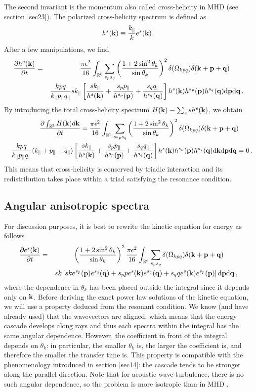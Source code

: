 \documentclass{jpp}
\def\be{\begin{equation}}
\def\ee{\end{equation}}
\def\ba{\begin{eqnarray}}
\def\ea{\end{eqnarray}}
\def\kk{{\bf k}}
\def\pp{{\bf p}}
\def\qq{{\bf q}}
\def\kpa{k_{\parallel}}
\def\ppa{p_{\parallel}}
\def\qpa{q_{\parallel}}
\def\dd{\mathrm{d}}
\def\RR{{\mathbb{R}}}
\begin{document}
The second invariant is the momentum also called cross-helicity in MHD (see section \ref{sec23}). The polarized cross-helicity spectrum is defined as
\be
h^s(\kk) \equiv \frac{\kpa}{k} e^s(\kk) \, .
\ee
After a few manipulations, we find
\ba
\frac{\partial h^s(\kk)}{\partial t} &=& 
\frac{\pi \epsilon^2}{16} \int_{\RR^{6}} \sum_{s_{p} s_{q}}  \left(\frac{1 + 2 \sin^2 \theta_k}{\sin \theta_k}\right)^2
\delta(\Omega_{kpq}) \delta(\kk+\pp+\qq) \quad \quad \label{KE2} \\
&& \frac{kpq}{\kpa\ppa\qpa} s \kpa
\left[ \frac{s\kpa}{h^s(\kk)} + \frac{s_{p} \ppa}{h^{s_{p}}(\pp)} + \frac{s_{q} \qpa}{h^{s_{q}}(\qq)} \right] 
h^{s}(\kk) h^{s_{p}}(\pp) h^{s_{q}}(\qq) \dd \pp \dd \qq \, . \nonumber 
\ea
By introducing the total cross-helicity spectrum $H(\kk) \equiv \sum_s s h^s(\kk)$, we obtain
\ba
&&\frac{\partial \int_{\RR^{3}} H(\kk) d\kk}{\partial t} = 
\frac{\pi \epsilon^{2}}{16} \int_{\RR^{9}} \sum_{s s_{p} s_{q}}  \left(\frac{1 + 2 \sin^2 \theta_k}{\sin \theta_k}\right)^2
\delta(\Omega_{kpq}) \delta(\kk+\pp+\qq) \quad \quad \label{KE2} \\
&& \frac{kpq}{\kpa\ppa\qpa} (\kpa+\ppa+\qpa)
\left[ \frac{s\kpa}{h^s(\kk)} + \frac{s_{p} \ppa}{h^{s_{p}}(\pp)} + \frac{s_{q} \qpa}{h^{s_{q}}(\qq)} \right] 
h^{s}(\kk) h^{s_{p}}(\pp) h^{s_{q}}(\qq) \dd \kk \dd \pp \dd \qq = 0 \, . \nonumber 
\ea
This means that cross-helicity is conserved by triadic interaction and its redistribution takes place within a triad satisfying the resonance condition. 

\subsection{Angular anisotropic spectra}
For discussion purposes, it is best to rewrite the kinetic equation for energy as follows
\ba
\frac{\partial e^s(\kk)}{\partial t} &=& \left(\frac{1 + 2 \sin^2 \theta_k}{\sin \theta_k}\right)^2
\frac{\pi \epsilon^{2}}{16} \int_{\RR^{6}} \sum_{s_{p} s_{q}}  
\delta(\Omega_{kpq}) \delta(\kk+\pp+\qq) \quad \quad \label{Kx1} \\
&& s k 
\left[ sk e^{s_p}(\pp) e^{s_q}(\qq) + s_p p e^s(\kk) e^{s_q}(\qq) + s_q q e^s(\kk) e^{s_p}(\pp) \right] 
 \dd \pp \dd \qq \, , \nonumber 
\ea
where the dependence in $\theta_k$ has been placed outside the integral since it depends only on $\kk$. Before deriving the exact power law solutions of the kinetic equation, we will use a property deduced from the resonant condition. We know (and have already used) that the wavevectors are aligned, which means that the energy cascade develops along rays and thus each spectra within the integral has the same angular dependence. However, the coefficient in front of the integral depends on $\theta_k$: in particular, the smaller $\theta_k$ is, the larger the coefficient is, and therefore the smaller the transfer time is. This property is compatible with the phenomenology introduced in section \ref{sec14}: the cascade tends to be stronger along the parallel direction. 
Note that for acoustic wave turbulence, there is no such  angular dependence, so the problem is more isotropic than in MHD \citep{Zakharov1970}. 
\end{document}
